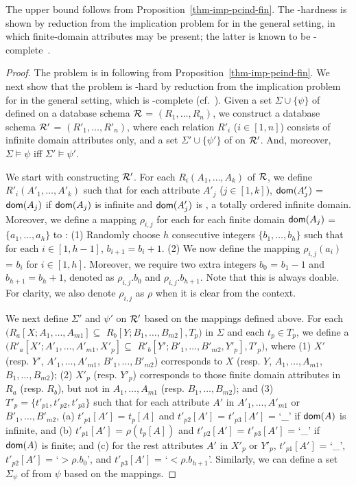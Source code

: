 \proofs The \EXPTIME upper bound follows from
Proposition~\ref{thm-imp-pcind-fin}. The \EXPTIME-hardness is
shown by reduction from the implication problem for \CINDs in the
general setting, in which finite-domain attributes may be present;
the latter is known to be \EXPTIME-complete~\cite{CINDs}. \eop


\begin{proof}
The problem is in \EXPTIME following from
Proposition~\ref{thm-imp-pcind-fin}. We next show that the problem
is \EXPTIME-hard by reduction from the implication problem for
\CINDs in the general setting, which is \EXPTIME-complete
(cf.~\cite{CINDs}). Given a set $\Sigma\cup\{\psi\}$ of \CINDs
defined on a database schema ${\cal R}$ = $(R_1,\ldots, R_n)$, we
construct a database schema ${\cal R'}$ = $(R'_1,\ldots, R'_n)$,
where each relation $R'_i$ ($i\in[1, n]$) consists of infinite
domain attributes only, and a set $\Sigma'\cup\{\psi'\}$ of \pCINDs
on ${\cal R'}$. And, moreover, $\Sigma\models\psi$ iff
$\Sigma'\models\psi'$.

We start with constructing ${\cal R'}$. For each
$R_i(A_1,\ldots,A_k)$ of ${\cal R}$, we define
$R'_i(A'_1,\ldots,A'_k)$ such that for each attribute $A'_j$
($j\in[1, k]$), $\protect\mathsf{dom}(A'_j)$ = $\protect\mathsf{dom}(A_j)$ if $\protect\mathsf{dom}(A_j)$ is
infinite and $\protect\mathsf{dom}(A'_j)$ is , a totally ordered
infinite domain. Moreover, we define a mapping $\rho_{i,j}$  for
each for each finite domain $\protect\mathsf{dom}(A_j)$ = $\{a_1,\ldots,a_h\}$ to
: (1) Randomly choose $h$ consecutive integers $\{b_1,
\ldots, b_h\}$ such that for each $i\in[1, h-1]$, $b_{i+1} = b_i +
1$. (2) We now define the mapping $\rho_{i,j}(a_i)$ = $b_i$ for
$i\in[1, h]$. Moreover, we require two extra integers $b_0$ = $b_1 -
1$ and $b_{h+1} = b_h + 1$, denoted as $\rho_{i,j}.b_0$ and
$\rho_{i,j}.b_{h+1}$. Note that this is always doable. For clarity,
we also denote $\rho_{i,j}$ as $\rho$ when it is clear from the
context.

We next define  $\Sigma'$ and $\psi'$ on ${\cal R'}$ based on the
mappings defined above. For each \CIND $(R_a[X; A_1,\ldots,A_{m1}]
\subseteq$ $R_b[Y; B_1,\ldots,B_{m2}], T_p)$ in $\Sigma$ and each
$t_p\in T_p$, we define a \pCIND $(R'_a[X';
A'_1,\ldots,A'_{m1},X'_p] \subseteq$ $R'_b[Y';
B'_1,\ldots,B'_{m2},Y'_p], T'_p)$, where (1) $X'$ (resp. $Y'$,
$A'_1,\ldots,A'_{m1}$, $B'_1,\ldots,B'_{m2}$) corresponds to $X$
(resp. $Y$, $A_1,\ldots,A_{m1}$, $B_1,\ldots,B_{m2}$); (2) $X'_p$
(resp. $Y'_p$) corresponds to those finite domain attributes in
$R_a$ (resp. $R_b$), but not in $A_1,\ldots,A_{m1}$ (resp.
$B_1,\ldots,B_{m2}$); and (3) $T'_p = \{t'_{p1},t'_{p2},t'_{p3}\}$
such that for each attribute $A'$ in $A'_1,\ldots,A'_{m1}$ or
$B'_1,\ldots,B'_{m2}$, (a) $t'_{p1}[A']$ = $t_p[A]$ and
$t'_{p2}[A']$ = $t'_{p3}[A']$ = `\_' if $\protect\mathsf{dom}(A)$ is infinite, and
(b) $t'_{p1}[A']$ = $\rho(t_p[A])$ and $t'_{p2}[A']$ = $t'_{p3}[A']$
= `\_' if $\protect\mathsf{dom}(A)$ is finite; and (c) for the rest attributes $A'$
in $X'_p$ or $Y'_p$, $t'_{p1}[A']$ = `\_', $t'_{p2}[A']$ =
`$>\rho.b_0$', and $t'_{p3}[A']$ = `$<\rho.b_{h+1}$'. Similarly, we
can define a set $\Sigma_{\psi}$ of \pCINDs from $\psi$ based on the
mappings.


\end{proof}

